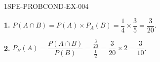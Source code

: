 \begin{corrige}{1SPE-PROBCOND-EX-004}

\textbf{1.} $P(A \cap B) = P(A) \times P_A(B) = \dfrac{1}{4} \times \dfrac{3}{5} = \dfrac{3}{20}$.

\medskip
\textbf{2.} $P_B(A) = \dfrac{P(A \cap B)}{P(B)} = \dfrac{\frac{3}{20}}{\frac{1}{2}} = \dfrac{3}{20} \times 2 = \dfrac{3}{10}$.

\end{corrige}
